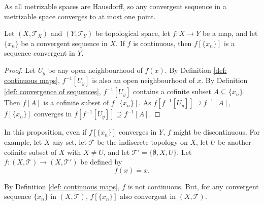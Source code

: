 \begin{note}
	As all metrizable spaces are Hausdorff, so any convergent sequence in a metrizable space converges to at most one point.
\end{note}


\begin{proposition}
	Let $(X, \mathcal T_X)$ and $(Y, \mathcal T_Y)$ be topological space, let $f: X \to Y$ be a map, and let $\{x_n\}$ be a convergent sequence in $X$. If $f$ is continuous, then $f[\{x_n\}]$ is a sequence convergent in $Y$.
	
	\begin{proof}
		Let $U_y$ be any open neighbourhood of $f(x)$. By Definition \ref{def: continuous maps}, $f^{-1}[U_y]$ is also an open neighbourhood of $x$. By Definition \ref{def: convergence of sequences}, $f^{-1}[U_y]$ contains a cofinite subset $A \subseteq \{x_n\}$. Then $f[A]$ is a cofinite subset of $f[\{x_n\}]$. As $f[f^{-1}[U_y]] \supseteq f^{-1}[A]$, $f[\{x_n\}]$ converges in $f[f^{-1}[U_y]] \supseteq f^{-1}[A]$.
	\end{proof}		
\end{proposition}


\begin{note}
	In this proposition, even if $f[\{x_n\}]$ converges in $Y$, $f$ might be discontinuous. For example, let $X$ any set, let $\mathcal T$ be the indiscrete topology on $X$, let $U$ be another cofinite subset of $X$ with $X \ne U$, and let $\mathcal T' = \{ \emptyset, X, U\}$. Let $f: (X, \mathcal T) \to (X, \mathcal T')$ be defined by
	$$
	f(x) = x.
	$$
	
	By Definition \ref{def: continuous maps}, $f$ is not continuous. But, for any convergent sequence $\{x_n\}$ in $(X, \mathcal T)$, $f[\{x_n\}]$ also convergent in $(X, \mathcal T)$.
\end{note}






































%